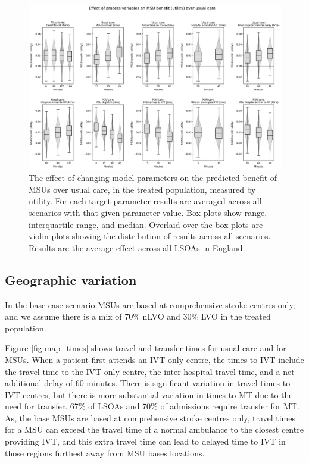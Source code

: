 \begin{figure}[h!]
    \centering
    \includegraphics[width=1\linewidth]{images/msu_net_utility_benefit.png}
    \caption{The effect of changing model parameters on the predicted benefit of MSUs over usual care, in the treated population, measured by utility. For each target parameter results are averaged across all scenarios with that given parameter value. Box plots show range, interquartile range, and median. Overlaid over the box plots are violin plots showing the distribution of results across all scenarios. Results are the average effect across all LSOAs in England.}
    \label{fig:scenarios_utility}
\end{figure}

\subsection{Geographic variation}

In the base case scenario MSUs are based at comprehensive stroke centres only, and we assume there is a mix of 70\% nLVO and 30\% LVO in the treated population.

Figure \ref{fig:map_times} shows travel and transfer times for usual care and for MSUs. When a patient first attends an IVT-only centre, the times to IVT include the travel time to the IVT-only centre, the inter-hospital travel time, and a net additional delay of 60 minutes. There is significant variation in travel times to IVT centres, but there is more substantial variation in times to MT due to the need for transfer. 67\% of LSOAs and 70\% of admissions require transfer for MT. As, the base MSUs are based at comprehensive stroke centres only, travel times for a MSU can exceed the travel time of a normal ambulance to the closest centre providing IVT, and this extra travel time can lead to delayed time to IVT in those regions furthest away from MSU bases locations.

